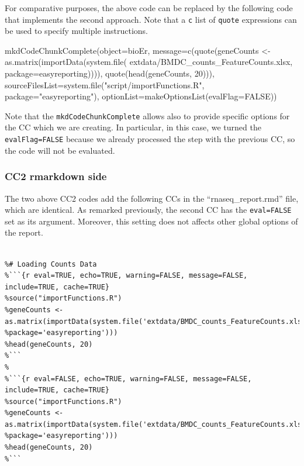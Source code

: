 \documentclass[
]{article}
\newenvironment{Shaded}{\begin{snugshade}}{\end{snugshade}}
\newcommand{\AttributeTok}[1]{\textcolor[rgb]{0.77,0.63,0.00}{#1}}
\newcommand{\ConstantTok}[1]{\textcolor[rgb]{0.00,0.00,0.00}{#1}}
\newcommand{\DecValTok}[1]{\textcolor[rgb]{0.00,0.00,0.81}{#1}}
\newcommand{\FunctionTok}[1]{\textcolor[rgb]{0.00,0.00,0.00}{#1}}
\newcommand{\NormalTok}[1]{#1}
\newcommand{\OtherTok}[1]{\textcolor[rgb]{0.56,0.35,0.01}{#1}}
\newcommand{\StringTok}[1]{\textcolor[rgb]{0.31,0.60,0.02}{#1}}
\begin{document}
For comparative purposes, the above code can be replaced by the
following code that implements the second approach. Note that a
\texttt{c} list of \texttt{quote} expressions can be used to specify
multiple instructions.

\begin{Shaded}
\begin{Highlighting}[]
\FunctionTok{mkdCodeChunkComplete}\NormalTok{(}\AttributeTok{object=}\NormalTok{bioEr, }\AttributeTok{message=}\FunctionTok{c}\NormalTok{(}\FunctionTok{quote}\NormalTok{(geneCounts }\OtherTok{\textless{}{-}}   
                  \FunctionTok{as.matrix}\NormalTok{(}\FunctionTok{importData}\NormalTok{(}\FunctionTok{system.file}\NormalTok{(}
                  \StringTok{\textquotesingle{}extdata/BMDC\_counts\_FeatureCounts.xlsx\textquotesingle{}}\NormalTok{, }
                  \AttributeTok{package=}\StringTok{\textquotesingle{}easyreporting\textquotesingle{}}\NormalTok{)))), }\FunctionTok{quote}\NormalTok{(}\FunctionTok{head}\NormalTok{(geneCounts, }\DecValTok{20}\NormalTok{))),}
                  \AttributeTok{sourceFilesList=}\FunctionTok{system.file}\NormalTok{(}\StringTok{"script/importFunctions.R"}\NormalTok{, }
                  \AttributeTok{package=}\StringTok{"easyreporting"}\NormalTok{), }
                  \AttributeTok{optionList=}\FunctionTok{makeOptionsList}\NormalTok{(}\AttributeTok{evalFlag=}\ConstantTok{FALSE}\NormalTok{))}
\end{Highlighting}
\end{Shaded}

Note that the \texttt{mkdCodeChunkComplete} allows also to provide
specific options for the CC which we are creating. In particular, in
this case, we turned the \texttt{evalFlag=FALSE} because we already
processed the step with the previous CC, so the code will not be
evaluated.

\hypertarget{cc2-rmarkdown-side}{%
\subsubsection{CC2 rmarkdown side}\label{cc2-rmarkdown-side}}

The two above CC2 codes add the following CCs in the
``rnaseq\_report.rmd'' file, which are identical. As remarked
previously, the second CC has the \texttt{eval=FALSE} set as its
argument. Moreover, this setting does not affects other global options
of the report.

\begin{verbatim}
 
%# Loading Counts Data
%```{r eval=TRUE, echo=TRUE, warning=FALSE, message=FALSE, include=TRUE, cache=TRUE}
%source("importFunctions.R")
%geneCounts <- as.matrix(importData(system.file('extdata/BMDC_counts_FeatureCounts.xlsx', 
%package='easyreporting')))
%head(geneCounts, 20)
%```
%
%```{r eval=FALSE, echo=TRUE, warning=FALSE, message=FALSE, include=TRUE, cache=TRUE}
%source("importFunctions.R")
%geneCounts <- as.matrix(importData(system.file('extdata/BMDC_counts_FeatureCounts.xlsx', 
%package='easyreporting')))
%head(geneCounts, 20)
%```
\end{verbatim}
\end{document}
